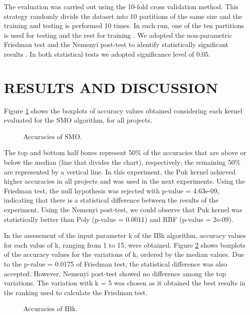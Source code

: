 \documentclass{sig-alternate}
\begin{document}
The evaluation was carried out using the 10-fold cross validation method. This strategy randomly divide the dataset into 10 partitions of the same size and the training and testing is performed 10 times. In each run, one of the ten partitions is used for testing and the rest for training \cite{han_data_2011}. We adopted the non-parametric Friedman test and the Nemenyi post-test \cite{pohlert_pairwise_2014} to identify statistically significant results \cite{demsar_statistical_2006}. In both statistical tests we adopted significance level of 0.05.


\section{RESULTS AND DISCUSSION}
Figure \ref{fig:smo} shows the boxplots of accuracy values obtained considering each kernel evaluated for the SMO algorithm, for all projects. 
\begin{figure}[htb]
\centering
{}
\vspace{-0.4cm}
\caption{Accuracies of SMO.}\label{fig:smo}
\end{figure}

The top and bottom half boxes represent 50\% of the accuracies that are above or below the median (line that divides the chart), respectively; the remaining 50\% are represented by a vertical line. In this experiment, the Puk kernel achieved higher accuracies in all projects and was used in the next experiments. Using the Friedman test, the null hypothesis was rejected with p-value = 4.63e-09, indicating that there is a statistical difference between the results of the experiment. Using the Nemenyi post-test, we could observe that Puk kernel was statistically better than Poly (p-value = 0.0011) and RBF (p-value = 2e-09).

In the assessment of the input parameter k of the IBk algorithm, accuracy values for each value of k, ranging from 1 to 15, were obtained. Figure \ref{fig:ibk} shows boxplots of the accuracy values for the variations of k, ordered by the median values. Due to the p-value = 0.0175 of Friedman test, the statistical difference was also accepted. However, Nemenyi post-test showed no difference among the top variations. The variation with k = 5 was chosen as it obtained the best results in the ranking used to calculate the Friedman test.
\begin{figure}[h]
\centering
{}
\vspace{-0.8cm}
\caption{Accuracies of IBk.}\label{fig:ibk}
\end{figure}
\end{document}
